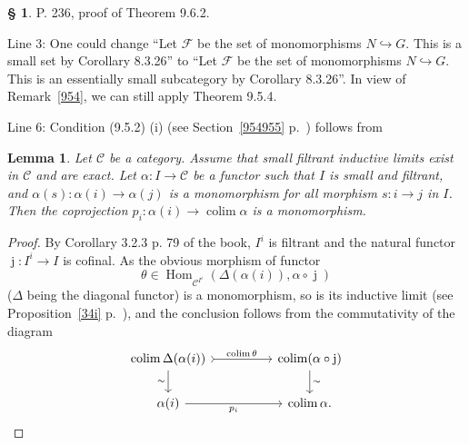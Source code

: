 \documentclass[12pt]{article}%
\newtheorem{lem}[thm]{Lemma}
\theoremstyle{remark}
\theoremstyle{definition}
\newtheorem{s}[thm]{\S}%
\newcommand{\cc}{\mathcal}
\newcommand{\oo}{\operatorname}
\newcommand{\C}{\mathcal C}
\newcommand{\incl}{\hookrightarrow}
\DeclareMathOperator*{\colim}{colim}
\DeclareMathOperator{\Hom}{Hom}%
\begin{document}
\begin{s}\label{962}
P. 236, proof of Theorem 9.6.2. 

Line 3: One could change ``Let $\cc F$ be the set of monomorphisms $N\incl G$. This is a small set by Corollary 8.3.26'' to ``Let $\cc F$ be the set of monomorphisms $N\incl G$. This is an essentially small subcategory by Corollary 8.3.26''. In view of Remark~\ref{954}, we can still apply Theorem 9.5.4.

Line 6: Condition (9.5.2) (i) (see Section~\ref{954955} p.~\pageref{954955}) follows from 
%
\begin{lem}\label{952i}
Let $\C$ be a category. Assume that small filtrant inductive limits exist in $\C$ and are exact. Let $\alpha:I\to\C$ be a functor such that $I$ is small and filtrant, and $\alpha(s):\alpha(i)\to\alpha(j)$ is a monomorphism for all morphism $s:i\to j$ in $I$. Then the coprojection $p_i:\alpha(i)\to\colim\alpha$ is a monomorphism.
\end{lem}
%
\begin{proof}
By Corollary 3.2.3 p. 79 of the book, $I^i$ is filtrant and the natural functor $\oo j:I^i\to I$ is cofinal. As the obvious morphism of functor 
$$
\theta\in\Hom_{\C^{I^i}}(\Delta(\alpha(i)),\alpha\circ\oo j)
$$ 
($\Delta$ being the diagonal functor) is a monomorphism, so is its inductive limit (see Proposition~\ref{34i} p.~\pageref{34i}), and the conclusion follows from the commutativity of the diagram 
$$
\begin{tikzcd}
\colim\Delta(\alpha(i))\ar{d}[swap]{\sim}\ar[tail]{rr}{\colim\theta}&&\colim(\alpha\circ\oo j)\ar{d}{\sim}\\ 
\alpha(i)\ar{rr}[swap]{p_i}&&\colim\alpha.
\end{tikzcd}
$$
\end{proof}
\end{s}
%
%
\end{document}
